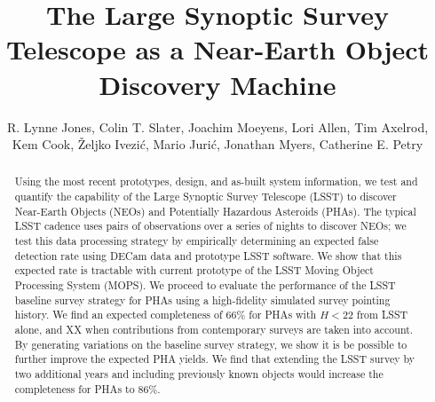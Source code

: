 \documentclass[12pt,preprint]{aastex}
\begin{document}
\title{The Large Synoptic Survey Telescope as a Near-Earth Object Discovery Machine}

\author{R. Lynne Jones,
Colin T. Slater,
Joachim Moeyens,
Lori Allen,
Tim Axelrod,
Kem Cook,
\v{Z}eljko Ivezi\'{c},
Mario Juri\'{c},
Jonathan Myers,
Catherine E. Petry
}

\begin{abstract}
Using the most recent prototypes, design, and as-built system information, we test and quantify the capability of the Large Synoptic Survey Telescope (LSST) to discover Near-Earth Objects (NEOs) and Potentially Hazardous Asteroids (PHAs).
The typical LSST cadence uses pairs of observations
over a series of nights to discover NEOs; we test this data processing strategy by empirically determining
an expected false detection rate using DECam data and prototype LSST software. We show
that this expected rate is tractable with current prototype of the LSST Moving Object Processing System (MOPS). 
We proceed to evaluate the performance of the LSST baseline survey strategy for  PHAs using a high-fidelity simulated survey pointing history. 
We find an expected completeness of 66\% for PHAs with $H<22$ 
from LSST alone, and XX when contributions from contemporary surveys are taken into account. By generating variations on the baseline survey strategy, we show it is be possible to further improve the expected PHA yields.
We find that extending the LSST survey by two additional years and 
including previously known objects would increase the completeness for PHAs to 86\%. 
\end{abstract}



\end{document}

